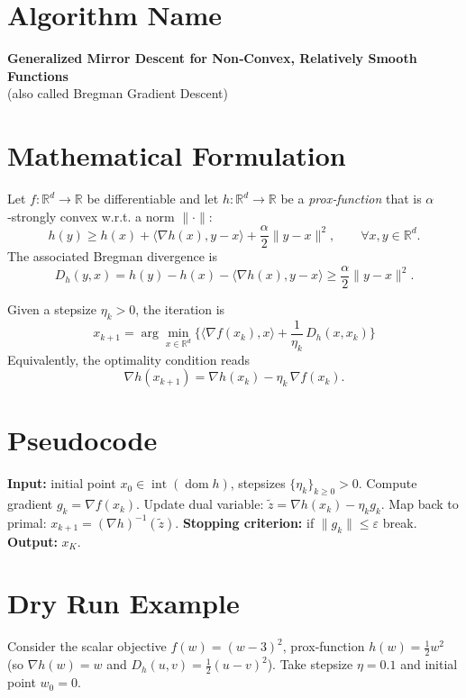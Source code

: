 \documentclass{article}
\newcommand{\inner}[2]{\langle #1,#2\rangle}
\newcommand{\Breg}[2]{D_h(#1,#2)}
\newcommand{\grad}[1]{\nabla #1}
\begin{document}
\section*{Algorithm Name}
\textbf{Generalized Mirror Descent for Non‑Convex, Relatively Smooth Functions}\\
(also called Bregman Gradient Descent)

\section*{Mathematical Formulation}
Let $f:\mathbb{R}^d\rightarrow\mathbb{R}$ be differentiable and let $h:\mathbb{R}^d\rightarrow\mathbb{R}$ be a \emph{prox‑function} that is $\alpha$‑strongly convex w.r.t. a norm $\|\cdot\|$:
\[
h(y)\ge h(x)+\inner{\grad{h}(x)}{y-x}+\frac{\alpha}{2}\|y-x\|^{2},
\qquad\forall x,y\in\mathbb{R}^{d}.
\]
The associated Bregman divergence is
\[
\Breg{y}{x}=h(y)-h(x)-\inner{\grad{h}(x)}{y-x}\ge\frac{\alpha}{2}\|y-x\|^{2}.
\]

Given a stepsize $\eta_k>0$, the iteration is
\begin{equation}
\boxed{
x_{k+1}= \arg\min_{x\in\mathbb{R}^{d}}
\Big\{ \inner{\grad{f}(x_k)}{x}+ \frac{1}{\eta_k}\,\Breg{x}{x_k}\Big\}
}
\label{eq:update}
\end{equation}
Equivalently, the optimality condition reads
\begin{equation}
\grad{h}(x_{k+1}) = \grad{h}(x_k)-\eta_k\,\grad{f}(x_k).
\label{eq:optcond}
\end{equation}

\section*{Pseudocode}
\begin{algorithm}[H]
\caption{Generalized Mirror Descent}
\begin{algorithmic}[1]
\STATE \textbf{Input:} initial point $x_{0}\in\operatorname{int}(\operatorname{dom}h)$,
stepsizes $\{\eta_k\}_{k\ge0}>0$.
    \STATE Compute gradient $g_k=\grad{f}(x_k)$.
    \STATE Update dual variable: $\tilde{z}= \grad{h}(x_k)-\eta_k g_k$.
    \STATE Map back to primal: $x_{k+1}= (\grad{h})^{-1}(\tilde{z})$.
    \STATE \textbf{Stopping criterion:} if $\|g_k\|\le\varepsilon$ break.
\ENDFOR
\STATE \textbf{Output:} $x_{K}$.
\end{algorithmic}
\end{algorithm}

\section*{Dry Run Example}
Consider the scalar objective $f(w)=(w-3)^{2}$, prox‑function $h(w)=\tfrac12 w^{2}$ (so $\grad{h}(w)=w$ and $D_h(u,v)=\tfrac12 (u-v)^{2}$).  
Take stepsize $\eta=0.1$ and initial point $w_{0}=0$.
\end{document}
